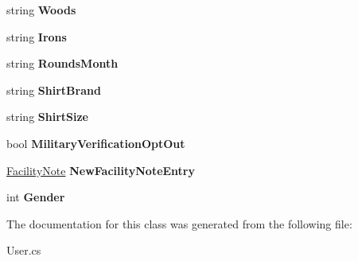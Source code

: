 \begin{DoxyCompactItemize}
string {\bfseries Woods}
\item 
\mbox{\label{class_golf_now_a_p_i_1_1_user_ade43994866dcf58c4dee08d95bdfe609}} 
string {\bfseries Irons}
\item 
\mbox{\label{class_golf_now_a_p_i_1_1_user_a8e77bd412f4b343f2f1ea270d73934b1}} 
string {\bfseries Rounds\+Month}
\item 
\mbox{\label{class_golf_now_a_p_i_1_1_user_a55324e2e8b2bf659a11cc639143ce4e2}} 
string {\bfseries Shirt\+Brand}
\item 
\mbox{\label{class_golf_now_a_p_i_1_1_user_a00cccc0128c91b51507a63bfc3583776}} 
string {\bfseries Shirt\+Size}
\item 
\mbox{\label{class_golf_now_a_p_i_1_1_user_a3d6d179e21b6727bce50eb25862f7373}} 
bool {\bfseries Military\+Verification\+Opt\+Out}
\item 
\mbox{\label{class_golf_now_a_p_i_1_1_user_a80c9a0c8e7f3ee1be48fb1ce2c64ef6a}} 
\mbox{\hyperlink{class_golf_now_a_p_i_1_1_facility_note}{Facility\+Note}} {\bfseries New\+Facility\+Note\+Entry}
\item 
\mbox{\label{class_golf_now_a_p_i_1_1_user_ade6e80dc020604a6b44af25e39f39b72}} 
int {\bfseries Gender}
\end{DoxyCompactItemize}


The documentation for this class was generated from the following file\+:\begin{DoxyCompactItemize}
\item 
User.\+cs\end{DoxyCompactItemize}
